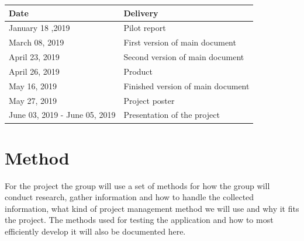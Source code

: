 \begin{tabu} to 1.2\textwidth { | X[l] | X[c] | }
    \hline
    \textbf{Date} & \textbf{Delivery} \\
    \hline
    January 18 ,2019 & Pilot report \\
    \hline
    March 08, 2019 & First version of main document \\
    \hline
    April 23, 2019 & Second version of main document \\
    \hline
    April 26, 2019 & Product \\
    \hline
    May 16, 2019 & Finished version of main document \\
    \hline
    May 27, 2019 & Project poster \\
    \hline
   June 03, 2019 - June 05, 2019 & Presentation of the project \\
    \hline
\end{tabu}
    
\section{Method} 
For the project the group will use a set of methods for how the group will conduct research, gather information and how to handle the collected information, what kind of project management method we will use and why it fits the project. The methods used for testing the application and how to most efficiently develop it will also be documented here. 

